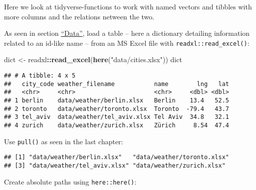 \documentclass[]{book}
\newenvironment{Shaded}{\begin{snugshade}}{\end{snugshade}}
\newcommand{\KeywordTok}[1]{\textcolor[rgb]{0.13,0.29,0.53}{\textbf{#1}}}
\newcommand{\NormalTok}[1]{#1}
\newcommand{\OperatorTok}[1]{\textcolor[rgb]{0.81,0.36,0.00}{\textbf{#1}}}
\newcommand{\StringTok}[1]{\textcolor[rgb]{0.31,0.60,0.02}{#1}}
\begin{document}
Here we look at tidyverse-functions to work with named vectors and tibbles with more columns and the relations netween the two.

As seen in section \protect\hyperlink{intro-data}{``Data''}, load a table -- here a dictionary detailing information related to an id-like name -- from an MS Excel file with \texttt{readxl::read\_excel()}:

\begin{Shaded}
\begin{Highlighting}[]
\NormalTok{dict <-}\StringTok{ }\NormalTok{readxl}\OperatorTok{::}\KeywordTok{read_excel}\NormalTok{(}\KeywordTok{here}\NormalTok{(}\StringTok{"data/cities.xlsx"}\NormalTok{))}
\NormalTok{dict}
\end{Highlighting}
\end{Shaded}

\begin{verbatim}
## # A tibble: 4 x 5
##   city_code weather_filename           name        lng   lat
##   <chr>     <chr>                      <chr>     <dbl> <dbl>
## 1 berlin    data/weather/berlin.xlsx   Berlin    13.4   52.5
## 2 toronto   data/weather/toronto.xlsx  Toronto  -79.4   43.7
## 3 tel_aviv  data/weather/tel_aviv.xlsx Tel Aviv  34.8   32.1
## 4 zurich    data/weather/zurich.xlsx   Zürich     8.54  47.4
\end{verbatim}

Use \texttt{pull()} as seen in the last chapter:

\begin{Shaded}
\end{Shaded}

\begin{verbatim}
## [1] "data/weather/berlin.xlsx"   "data/weather/toronto.xlsx" 
## [3] "data/weather/tel_aviv.xlsx" "data/weather/zurich.xlsx"
\end{verbatim}

Create absolute paths using \texttt{here::here()}:

\begin{Shaded}
\end{Shaded}
\end{document}
